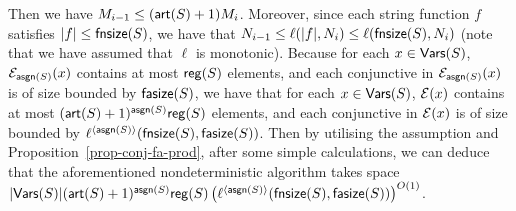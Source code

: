 {%
%
%
%
Then we have $M_{i-1} \le (\mathsf{art}(S)+1)M_i $. Moreover, since each string function $f$ satisfies   $|f| \le \mathsf{fnsize}(S)$, we have that $N_{i-1} \le \ell(|f|, N_i) \le \ell(\mathsf{fnsize}(S), N_i)$ (note that we have assumed that $\ell$ is monotonic). Because for each $x \in \mathsf{Vars}(S)$, $\mathcal{E}_{\mathsf{asgn}(S)}(x)$ contains at most $\mathsf{reg}(S)$ elements, and 
each conjunctive \FA{} in $\mathcal{E}_{\mathsf{asgn}(S)}(x)$ is of size bounded by $\mathsf{fasize}(S)$, we have that for each $x \in \mathsf{Vars}(S)$, $\mathcal{E}(x)$ contains at most $(\mathsf{art}(S)+1)^{\mathsf{asgn}(S)}\mathsf{reg}(S)$ elements, and each conjunctive \FA{} in $\mathcal{E}(x)$ is of size bounded by $\ell^{\langle \mathsf{asgn}(S) \rangle}(\mathsf{fnsize}(S), \mathsf{fasize}(S))$. 
Then by utilising  the \prerec{} assumption and
Proposition~\ref{prop-conj-fa-prod}, after some simple calculations, we can
deduce that the aforementioned nondeterministic algorithm takes space
$|\mathsf{Vars}(S)|(\mathsf{art}(S)+1)^{\mathsf{asgn}(S)}  \mathsf{reg}(S) \left(\ell^{\langle \mathsf{asgn}(S)
\rangle}(\mathsf{fnsize}(S), \mathsf{fasize}(S)) \right)^{O(1)}$.
 


}

